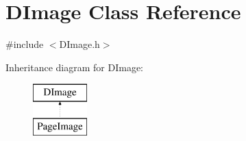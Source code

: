 \hypertarget{class_d_image}{\section{D\+Image Class Reference}
\label{class_d_image}
}


{\ttfamily \#include $<$D\+Image.\+h$>$}

Inheritance diagram for D\+Image\+:\begin{figure}[H]
\begin{center}
\leavevmode
\includegraphics[height=2.000000cm]{class_d_image}
\end{center}
\end{figure}

